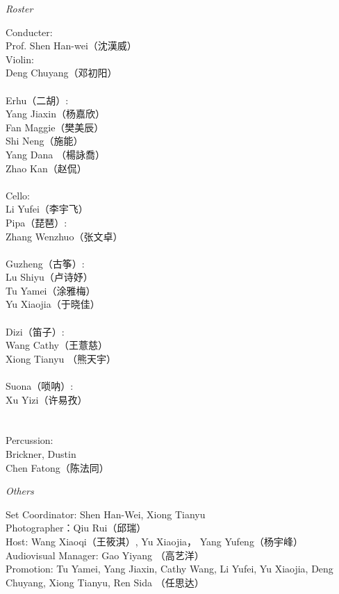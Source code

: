 \documentclass[letter,8pt,poets]{ConcProg}
\begin{document}
\begin{spacing}{1.0}
\begin{center}
\Large\textsl{ Roster}
\end{center}
\begin{multicols}{2}%
\begin{spacing}{1.5}
Conducter:\\
Prof. Shen  Han-wei（沈漢威）
\\
Violin:\\
Deng  Chuyang（邓初阳）\\
\\
Erhu（二胡）:     \\   
Yang  Jiaxin（杨嘉欣）\\  
Fan  Maggie（樊美辰）\\
Shi Neng（施能）\\
Yang  Dana （楊詠喬）\\
Zhao  Kan（赵侃）\\
\\
Cello:\\
Li  Yufei（李宇飞）\\

Pipa（琵琶）:\\
Zhang  Wenzhuo（张文卓）\\
\\
Guzheng（{古筝}）:\\
Lu  Shiyu（卢诗妤）\\
Tu  Yamei（涂雅梅）\\
Yu Xiaojia（于晓佳）
\\
\\
Dizi（笛子）: 				 \\
Wang  Cathy（王薏慈）\\
Xiong  Tianyu （熊天宇）\\
\\
Suona（唢呐）:\\
Xu  Yizi（许易孜）
\\
\\
\\
Percussion:\\
Brickner, Dustin\\
Chen Fatong（陈法同）\\
\end{spacing}
\end{multicols}
\begin{center}
\Large\textsl{ Others}
\end{center}
\begin{multicols}{2}%
Set Coordinator: Shen Han-Wei, Xiong Tianyu\\ 
Photographer：Qiu Rui（邱瑞）\\
Host: Wang Xiaoqi（王筱淇）, Yu Xiaojia， Yang Yufeng（杨宇峰） \\
Audiovisual Manager: Gao Yiyang （高艺洋） \\
Promotion: Tu Yamei, Yang Jiaxin, Cathy Wang, Li Yufei, Yu Xiaojia, Deng Chuyang, Xiong Tianyu, Ren Sida （任思达）



\end{multicols}
\end{spacing}
\end{document}

